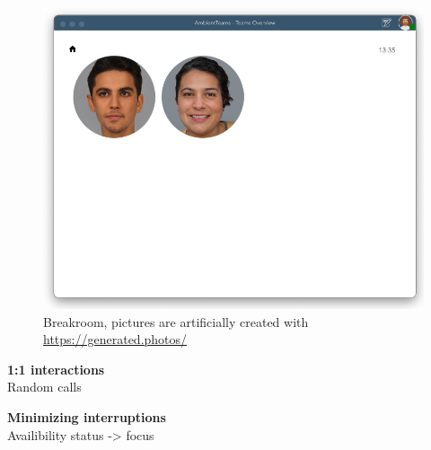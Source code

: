 \begin{figure}[h]
    \centering
    \includegraphics[width=.8\linewidth]{./images/breakroom.png}
    \caption{Breakroom, pictures are artificially created with \url{https://generated.photos/}}
    \label{fig:breakroom}
\end{figure}

\medskip\noindent\textbf{1:1 interactions} \\
Random calls

\medskip\noindent\textbf{Minimizing interruptions} \\
Availibility status -> focus
